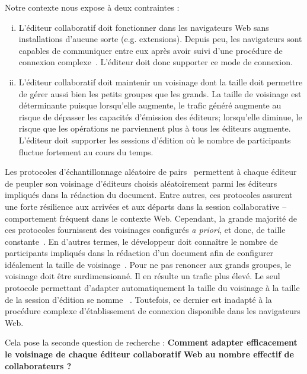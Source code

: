 \noindent Notre contexte nous expose à deux contraintes :

\begin{enumerate}[(i)]
\item L'éditeur collaboratif doit fonctionner dans les navigateurs Web sans
  installations d'aucune sorte (e.g. extensions). Depuis peu, les navigateurs
  sont capables de communiquer entre eux après avoir suivi d'une procédure de
  connexion complexe~\cite{webrtc}. L'éditeur doit donc supporter ce mode de
  connexion.

\item L'éditeur collaboratif doit maintenir un voisinage dont la taille doit
  permettre de gérer aussi bien les petits groupes que les grands.  La taille de
  voisinage est déterminante puisque lorsqu'elle augmente, le trafic généré
  augmente au risque de dépasser les capacités d'émission des éditeurs;
  lorsqu'elle diminue,
  le risque que les opérations ne parviennent plus à tous les éditeurs augmente.
  L'éditeur doit supporter les sessions d'édition où le nombre de participants
  fluctue fortement au cours du temps.
\end{enumerate}

Les protocoles d'échantillonnage aléatoire de pairs~\cite{jelasity2007gossip}
permettent à chaque éditeur de peupler son voisinage d'éditeurs choisis
aléatoirement parmi les éditeurs impliqués dans la rédaction du document. Entre
autres, ces protocoles assurent une forte résilience aux arrivées et aux départs
dans la session collaborative -- comportement fréquent dans le contexte
Web. Cependant, la grande majorité de ces protocoles fournissent des voisinages
configurés \emph{a priori}, et donc, de taille
constante~\cite{eugster2003lightweight, jelasity2007gossip,
  leitao2007dependable, tolgyeski2009adaptive, voulgaris2005cyclon}. En d'autres
termes, le développeur doit connaître le nombre de participants impliqués dans
la rédaction d'un document afin de configurer idéalement la taille de
voisinage~\cite{erdos1959random}.  Pour ne pas renoncer aux grands groupes, le
voisinage doit être surdimensionné. Il en résulte un trafic plus élevé. Le seul
protocole permettant d'adapter automatiquement la taille du voisinage à la
taille de la session d'édition se nomme \SCAMP~\cite{ganesh2003peer}. Toutefois,
ce dernier est inadapté à la procédure complexe d'établissement de connexion
disponible dans les navigateurs Web.

Cela pose la seconde question de recherche : \textbf{Comment adapter
  efficacement le voisinage de chaque éditeur collaboratif Web au nombre
  effectif de collaborateurs ?}


